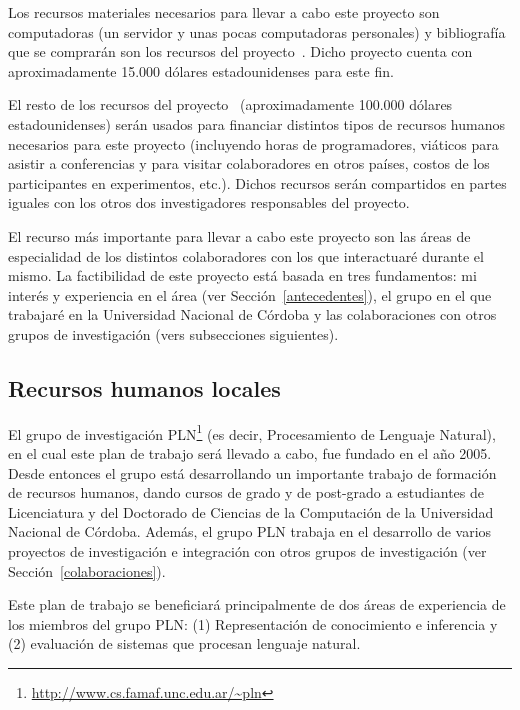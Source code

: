 \documentclass[11pt]{article}
\begin{document}
Los recursos materiales necesarios para llevar a cabo este proyecto son
computadoras (un servidor y unas pocas computadoras personales) y
bibliograf\'ia que se comprar\'an son los recursos del
proyecto~\citep{areces10b}. Dicho proyecto cuenta con aproximadamente 15.000
d\'olares estadounidenses para este fin. 

El resto de los recursos del proyecto~\citep{areces10b} (aproximadamente 100.000
d\'olares estadounidenses) ser\'an usados para financiar distintos tipos de
recursos humanos necesarios para este proyecto (incluyendo horas de
programadores, vi\'aticos para asistir a conferencias y para visitar
colaboradores en otros pa\'ises, costos de los participantes en experimentos,
etc.). Dichos recursos ser\'an compartidos en partes iguales con los otros dos
investigadores responsables del proyecto. 

El recurso m\'as importante para llevar a cabo este proyecto son las \'areas de
especialidad de los distintos colaboradores con los que interactuar\'e durante
el mismo. La factibilidad de este
proyecto est\'a basada en tres fundamentos: mi inter\'es y experiencia en el
\'area (ver Secci\'on~\ref{antecedentes}), el grupo en el que trabajar\'e en la
Universidad Nacional de C\'ordoba y las colaboraciones con otros grupos de
investigaci\'on (vers subsecciones siguientes). 


\subsection{Recursos humanos locales} \label{recursos-locales}

El grupo de investigaci\'on
PLN\footnote{\url{http://www.cs.famaf.unc.edu.ar/~pln}} (es decir,
Procesamiento de Lenguaje Natural), en el cual este plan de trabajo ser\'a
llevado a cabo, fue fundado en el a\~no 2005. Desde entonces el grupo est\'a
desarrollando un importante trabajo de formaci\'on de recursos humanos, dando
cursos de grado y de post-grado a estudiantes de Licenciatura y del Doctorado de
Ciencias de la Computaci\'on de la Universidad Nacional de C\'ordoba. Adem\'as,
el grupo PLN trabaja en el desarrollo de varios proyectos de investigaci\'on e
integraci\'on con otros grupos de investigaci\'on (ver
Secci\'on~\ref{colaboraciones}). 

Este plan de trabajo se beneficiar\'a principalmente de dos \'areas de
experiencia de los miembros del grupo PLN: (1) Representaci\'on de conocimiento
e inferencia y (2) evaluaci\'on de sistemas que procesan lenguaje natural. 
\end{document}
